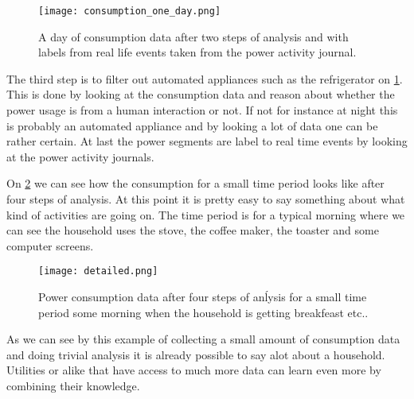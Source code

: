 \begin{figure}
  \begin{center}
    \texttt{[image: consumption\_one\_day.png]}
  \end{center}
  \caption{A day of consumption data after two steps of analysis and with labels from real life events taken from the power activity journal.}
  \label{consumption_one_day}
\end{figure}


The third step is to filter out automated appliances such as the refrigerator on \cref{consumption_one_day}.
This is done by looking at the consumption data and reason about whether the power usage is from a human interaction or not.
If not for instance at night this is probably an automated appliance and by looking a lot of data one can be rather certain.
At last the power segments are label to real time events by looking at the power activity journals.


On \cref{detailed_consumption} we can see how the consumption for a small time period looks like after four steps of analysis.
At this point it is pretty easy to say something about what kind of activities are going on.
The time period is for a typical morning where we can see the household uses the stove, the coffee maker, the toaster and some computer screens.

\begin{figure}
  \begin{center}
    \texttt{[image: detailed.png]}
  \end{center}
  \caption{Power consumption data after four steps of anĺysis for a small time period some morning when the household is getting breakfeast etc..}
  \label{detailed_consumption}
\end{figure}


As we can see by this example of collecting a small amount of consumption data and doing trivial analysis it is already possible to say alot about a household.
Utilities or alike that have access to much more data can learn even more by combining their knowledge.
